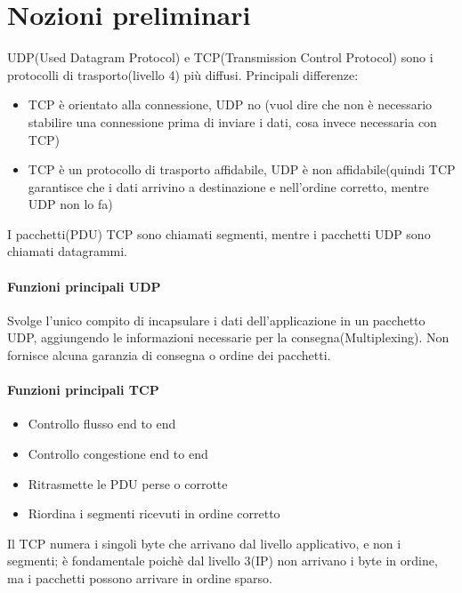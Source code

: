 \section{Nozioni preliminari}
UDP(Used Datagram Protocol) e TCP(Transmission Control Protocol) sono i protocolli di trasporto(livello 4) più diffusi.
Principali differenze:
\begin{itemize}
    \item TCP è orientato alla connessione, UDP no (vuol dire che non è necessario stabilire una connessione prima di inviare i dati, cosa invece necessaria con TCP)
    \item TCP è un protocollo di trasporto affidabile, UDP è non affidabile(quindi TCP garantisce che i dati arrivino a destinazione e nell'ordine corretto, mentre UDP non lo fa)
\end{itemize}

I pacchetti(PDU) TCP sono chiamati segmenti, mentre i pacchetti UDP sono chiamati datagrammi.

\paragraph{Funzioni principali UDP}
Svolge l'unico compito di incapsulare i dati dell'applicazione in un pacchetto UDP, aggiungendo le informazioni necessarie per la consegna(Multiplexing). Non fornisce alcuna garanzia di consegna o ordine dei pacchetti.
\paragraph{Funzioni principali TCP}
\begin{multicols}{2}
\begin{itemize}
    \item Controllo flusso end to end
    \item Controllo congestione end to end
    \item Ritrasmette le PDU perse o corrotte
    \item Riordina i segmenti ricevuti in ordine corretto
\end{itemize}
\end{multicols}
Il TCP numera i singoli byte che arrivano dal livello applicativo, e non i segmenti; è fondamentale poichè dal livello 3(IP) non arrivano i byte in ordine, ma i pacchetti possono arrivare in ordine sparso.

